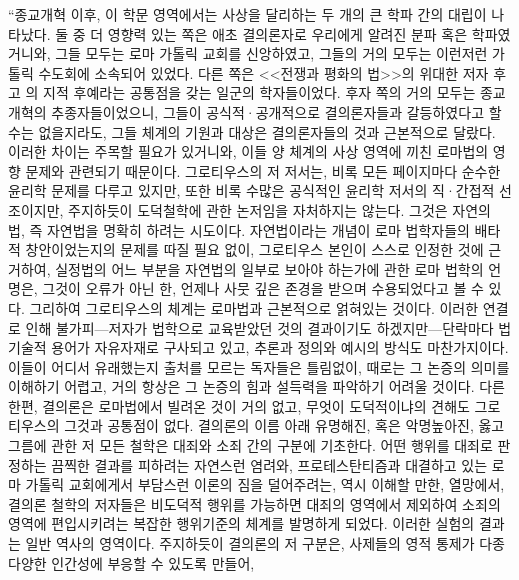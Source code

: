 ``종교개혁 이후,
이 학문 영역에서는
사상을 달리하는 두 개의 큰 학파 간의 대립이 나타났다.
둘 중 더 영향력 있는 쪽은 애초
결의론자로 우리에게 알려진 분파 혹은 학파였거니와,
그들 모두는 로마 가톨릭 교회를 신앙하였고,
그들의 거의 모두는 이런저런 가톨릭 수도회에 소속되어 있었다.
다른 쪽은
<<전쟁과 평화의 법>>의 위대한 저자
후고 의 지적 후예라는 공통점을 갖는
일군의 학자들이었다.
후자 쪽의 거의 모두는 종교개혁의 추종자들이었으니,
그들이 공식적^^b7공개적으로 결의론자들과 갈등하였다고 할 수는 없을지라도,
그들 체계의 기원과 대상은 결의론자들의 것과 근본적으로 달랐다.
이러한 차이는 주목할 필요가 있거니와,
이들 양 체계의 사상 영역에 끼친 로마법의 영향 문제와 관련되기 때문이다.
그로티우스의 저 저서는,
비록 모든 페이지마다 순수한 윤리학 문제를 다루고 있지만,
또한 비록 수많은 공식적인 윤리학 저서의 직^^b7간접적 선조이지만,
주지하듯이 도덕철학에 관한 논저임을 자처하지는 않는다.
그것은 자연의 법,
즉 자연법을 명확히 하려는 시도이다.
자연법이라는 개념이 로마 법학자들의 배타적 창안이었는지의
문제를 따질 필요 없이,
그로티우스 본인이 스스로 인정한 것에 근거하여,
실정법의 어느 부분을 자연법의 일부로 보아야 하는가에 관한
로마 법학의 언명은,
그것이 오류가 아닌 한,
언제나
사뭇 깊은 존경을 받으며 수용되었다고
볼 수 있다.
그리하여 그로티우스의 체계는
로마법과 근본적으로 얽혀있는 것이다.
이러한 연결로 인해 불가피---저자가 법학으로 교육받았던 것의
결과이기도 하겠지만---단락마다
법기술적 용어가 자유자재로 구사되고 있고,
추론과
정의와 예시의 방식도 마찬가지이다.
이들이 어디서 유래했는지 출처를 모르는 독자들은 틀림없이,
때로는 그 논증의 의미를 이해하기 어렵고,
거의 항상은 그 논증의 힘과 설득력을 파악하기 어려울 것이다.
다른 한편,
결의론은 로마법에서 빌려온 것이 거의 없고,
무엇이 도덕적이냐의 견해도 그로티우스의 그것과 공통점이 없다.
결의론의 이름 아래 유명해진, 혹은 악명높아진, 옳고 그름에 관한 저 모든 철학은
대죄와
소죄 간의 구분에 기초한다.
어떤 행위를 대죄로 판정하는 끔찍한 결과를 피하려는 자연스런 염려와,
프로테스탄티즘과 대결하고 있는 로마 가톨릭 교회에게서
부담스런 이론의 짐을 덜어주려는, 역시 이해할 만한, 열망에서,
결의론 철학의 저자들은
비도덕적 행위를 가능하면 대죄의 영역에서 제외하여
소죄의 영역에 편입시키려는 복잡한 행위기준의 체계를 발명하게 되었다.
이러한 실험의 결과는 일반 역사의 영역이다.
주지하듯이 결의론의 저 구분은,
사제들의 영적 통제가 다종다양한 인간성에 부응할 수 있도록 만들어,

